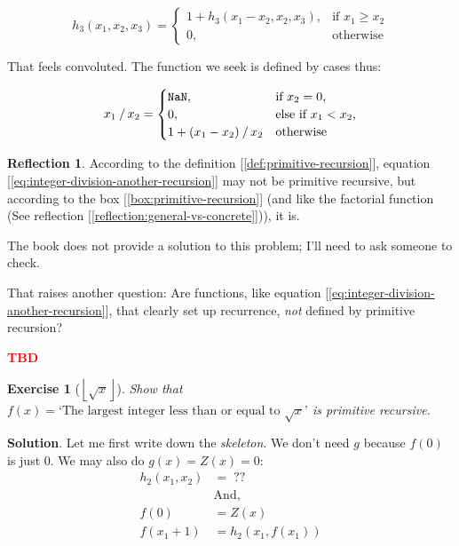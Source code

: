 \documentclass[11pt]{book}
\theoremstyle{definition}
\theoremstyle{plain}
\newtheorem{exercise}{Exercise}[chapter]
\theoremstyle{problemstyle}
\theoremstyle{remark}
\theoremstyle{definition}
\newtheorem{reflection}{Reflection}
\newcommand{\tbd}{
    \vspace{5mm}
    \textbf{\textcolor{red}{\Large{TBD}}}
    \vspace{5mm}
}
\begin{document}
    \[ 
    h_3(x_1,x_2,x_3)=
        \begin{cases}
            1 + h_3(x_1-x_2,x_2,x_3), & \text{if $x_1\geq x_2$}\\
            0, & \text{otherwise}
		 \end{cases}
    \]

    That feels convoluted. The function we seek is defined by cases thus:

    \begin{equation}
      \label{eq:integer-division-another-recursion}
        x_1\;\sfrac{}{}\;x_2=
        \begin{cases}
            \texttt{NaN}, & \text{if $x_2=0$,}\\
            0, & \text{else if $x_1<x_2$,}\\
            1 + (x_1-x_2)\;\sfrac{}{}\;x_2&\text{otherwise}
		 \end{cases}
    \end{equation}

    \begin{reflection}
        According to the definition [\ref{def:primitive-recursion}], equation [\ref{eq:integer-division-another-recursion}] may not be primitive recursive, but according to the box [\ref{box:primitive-recursion}] (and like the factorial function (See reflection [\ref{reflection:general-vs-concrete}])), it is.

    The book does not provide a solution to this problem; I'll need to ask someone to check.

        That raises another question: Are functions, like equation [\ref{eq:integer-division-another-recursion}], that clearly set up recurrence, \emph{not} defined by primitive recursion?
    \end{reflection}

    \tbd

\begin{exercise}[$\left\lfloor{\sqrt{x}}\right\rfloor$]
    Show that $f(x)=\text{`The largest integer less than or equal to $\sqrt{x}$'}$ is primitive recursive.
\end{exercise}
\textbf{Solution}.
Let me first write down the \emph{skeleton}. We don't need $g$ because $f(0)$ is just $0$. We may also do $g(x)=Z(x)=0$:
            \begin{equation}
                \label{eq:floor-root-x}
                \begin{aligned}
                    h_2(x_1,x_2)&=\;??\\
                    &\text{And,}\\
                    f(0)&=Z(x)\\
                    f(x_1+1)&=h_2(x_1,f(x_1))
                \end{aligned}
            \end{equation}
\end{document}
